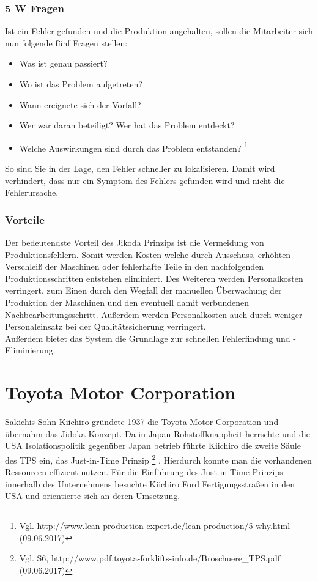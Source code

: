 \documentclass[00_ToyotaProduktionssystem.tex]{subfiles}
\begin{document}
\subsubsection{5 W Fragen}
Ist ein Fehler gefunden und die Produktion angehalten, sollen die Mitarbeiter sich nun folgende fünf Fragen stellen:
\begin{itemize}
\item{Was ist genau passiert?}
\item{Wo ist das Problem aufgetreten?}
\item{Wann ereignete sich der Vorfall?}
\item{Wer war daran beteiligt? Wer hat das Problem entdeckt?}
\item{Welche Auswirkungen sind durch das Problem entstanden?}
\footnote{Vgl.  http://www.lean-production-expert.de/lean-production/5-why.html (09.06.2017)}
\end{itemize}
So sind Sie in der Lage, den Fehler schneller zu lokalisieren. Damit wird verhindert, dass nur ein Symptom des Fehlers gefunden wird und nicht die Fehlerursache.


\subsubsection{Vorteile}
Der bedeutendste Vorteil des Jikoda Prinzips ist die Vermeidung von Produktionsfehlern. Somit werden Kosten   welche durch Ausschuss, erhöhten Verschleiß der Maschinen oder fehlerhafte Teile in den nachfolgenden Produktionsschritten entstehen eliminiert. Des Weiteren werden Personalkosten verringert, zum Einen durch den Wegfall der manuellen Überwachung der Produktion der Maschinen und den eventuell damit verbundenen Nachbearbeitungsschritt. Außerdem werden Personalkosten auch durch weniger Personaleinsatz bei der Qualitätssicherung verringert.\\
Außerdem bietet das System die Grundlage zur schnellen Fehlerfindung und -Eliminierung.
\section{Toyota Motor Corporation}
Sakichis Sohn Kiichiro gründete 1937 die Toyota Motor Corporation und übernahm das Jidoka Konzept. Da in Japan Rohstoffknappheit herrschte und die USA Isolationspolitik gegenüber Japan betrieb führte Kiichiro die zweite Säule des TPS ein, das Just-in-Time Prinzip
\footnote{Vgl. S6,  http://www.pdf.toyota-forklifts-info.de/Broschuere\_TPS.pdf (09.06.2017)}
. Hierdurch konnte man die vorhandenen Ressourcen effizient nutzen. Für die Einführung des Just-in-Time Prinzips innerhalb des Unternehmens besuchte Kiichiro Ford Fertigungsstraßen in den USA und orientierte sich an deren Umsetzung.
\end{document}
